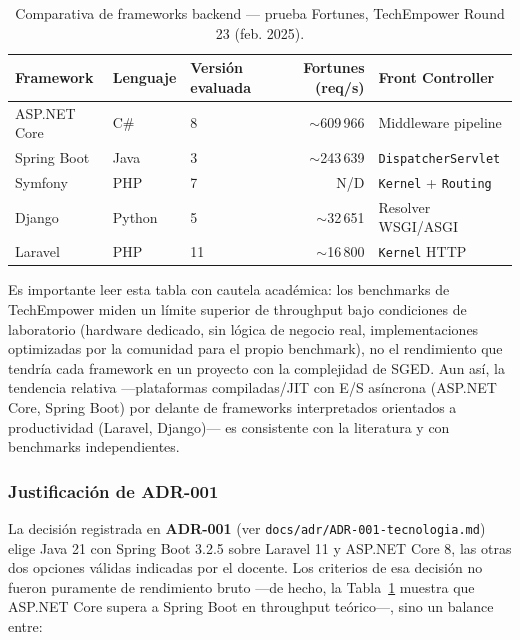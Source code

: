\documentclass[12pt,a4paper]{article}
\begin{document}
\begin{table}[h!]
\centering
\small
\begin{tabular}{@{}lllrl@{}}
\toprule
\textbf{Framework} & \textbf{Lenguaje} & \textbf{Versión evaluada} & \textbf{Fortunes (req/s)} & \textbf{Front Controller} \\
\midrule
ASP.NET Core & C\# & 8 & $\sim$609\,966 & Middleware pipeline \\
Spring Boot  & Java & 3 & $\sim$243\,639 & \texttt{DispatcherServlet} \\
Symfony      & PHP  & 7 & N/D\footnotemark & \texttt{Kernel} + \texttt{Routing} \\
Django       & Python & 5 & $\sim$32\,651  & Resolver WSGI/ASGI \\
Laravel      & PHP  & 11 & $\sim$16\,800   & \texttt{Kernel} HTTP \\
\bottomrule
\end{tabular}
\caption{Comparativa de frameworks backend --- prueba Fortunes, TechEmpower Round 23 (feb. 2025).}
\label{tab:comparativa-frameworks}
\end{table}

Es importante leer esta tabla con cautela académica: los benchmarks de
TechEmpower miden un límite superior de throughput bajo condiciones de
laboratorio (hardware dedicado, sin lógica de negocio real, implementaciones
optimizadas por la comunidad para el propio benchmark), no el rendimiento
que tendría cada framework en un proyecto con la complejidad de SGED. Aun
así, la tendencia relativa —plataformas compiladas/JIT con E/S asíncrona
(ASP.NET Core, Spring Boot) por delante de frameworks interpretados
orientados a productividad (Laravel, Django)— es consistente con la
literatura y con benchmarks independientes.

\subsubsection{Justificación de ADR-001}

La decisión registrada en \textbf{ADR-001} (ver
\texttt{docs/adr/ADR-001-tecnologia.md}) elige Java 21 con Spring Boot 3.2.5
sobre Laravel 11 y ASP.NET Core 8, las otras dos opciones válidas indicadas
por el docente. Los criterios de esa decisión no fueron puramente de
rendimiento bruto —de hecho, la Tabla~\ref{tab:comparativa-frameworks}
muestra que ASP.NET Core supera a Spring Boot en throughput teórico—, sino
un balance entre:
\end{document}
